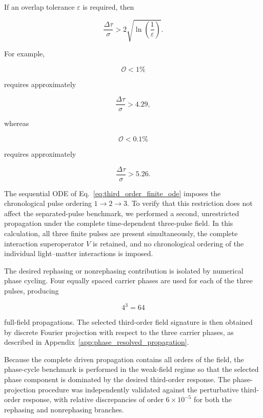 \documentclass[11pt]{article}
\begin{document}
If an overlap tolerance $\varepsilon$ is required, then

\begin{equation}
\frac{\Delta\tau}{\sigma}
>
2
\sqrt{
\ln\left(
\frac{1}{\varepsilon}
\right)
}.
\label{eq:third_order_gaussian_separation}
\end{equation}

For example,

\begin{equation}
\mathcal{O}<1\%
\end{equation}

requires approximately

\begin{equation}
\frac{\Delta\tau}{\sigma}
>
4.29,
\end{equation}

whereas

\begin{equation}
\mathcal{O}<0.1\%
\end{equation}

requires approximately

\begin{equation}
\frac{\Delta\tau}{\sigma}
>
5.26.
\end{equation}

The sequential ODE of
Eq.~\eqref{eq:third_order_finite_ode} imposes the chronological pulse
ordering $1\rightarrow2\rightarrow3$. To verify that this restriction
does not affect the separated-pulse benchmark, we performed a second,
unrestricted propagation under the complete time-dependent
three-pulse field. In this calculation, all three finite pulses are
present simultaneously, the complete interaction superoperator $V$ is
retained, and no chronological ordering of the individual
light--matter interactions is imposed.

The desired rephasing or nonrephasing contribution is isolated by
numerical phase cycling. Four equally spaced carrier phases are used
for each of the three pulses, producing

\begin{equation}
4^3=64
\end{equation}

full-field propagations. The selected third-order field signature is
then obtained by discrete Fourier projection with respect to the three
carrier phases, as described in
Appendix~\ref{app:phase_resolved_propagation}.

Because the complete driven propagation contains all orders of the
field, the phase-cycle benchmark is performed in the weak-field regime
so that the selected phase component is dominated by the desired
third-order response. The phase-projection procedure was independently
validated against the perturbative third-order response, with relative
discrepancies of order $6\times10^{-5}$ for both the rephasing and
nonrephasing branches.
\end{document}
